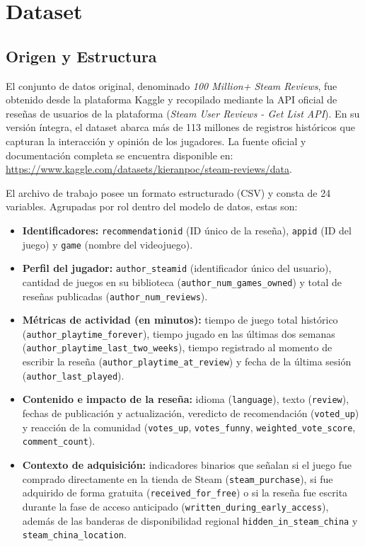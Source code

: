 \section{Dataset}

\subsection{Origen y Estructura}
El conjunto de datos original, denominado \textit{100 Million+ Steam Reviews}, fue obtenido desde la plataforma Kaggle y recopilado mediante la API oficial de reseñas de usuarios de la plataforma (\textit{Steam User Reviews - Get List API}). En su versión íntegra, el dataset abarca más de 113 millones de registros históricos que capturan la interacción y opinión de los jugadores. La fuente oficial y documentación completa se encuentra disponible en: \url{https://www.kaggle.com/datasets/kieranpoc/steam-reviews/data}.

El archivo de trabajo posee un formato estructurado (CSV) y consta de 24 variables. Agrupadas por rol dentro del modelo de datos, estas son:

\begin{itemize}[leftmargin=*]
    \item \textbf{Identificadores:} \texttt{recommendationid} (ID único de la reseña), \texttt{appid} (ID del juego) y \texttt{game} (nombre del videojuego).
    \item \textbf{Perfil del jugador:} \texttt{author\_steamid} (identificador único del usuario), cantidad de juegos en su biblioteca (\texttt{author\_\bk{}num\_\bk{}games\_\bk{}owned}) y total de reseñas publicadas (\texttt{author\_num\_reviews}).
    \item \textbf{Métricas de actividad (en minutos):} tiempo de juego total histórico (\texttt{author\_\bk{}playtime\_\bk{}forever}), tiempo jugado en las últimas dos semanas (\texttt{author\_\bk{}playtime\_\bk{}last\_\bk{}two\_\bk{}weeks}), tiempo registrado al momento de escribir la reseña (\texttt{author\_\bk{}playtime\_\bk{}at\_\bk{}review}) y fecha de la última sesión (\texttt{author\_last\_played}).
    \item \textbf{Contenido e impacto de la reseña:} idioma (\texttt{language}), texto (\texttt{review}), fechas de publicación y actualización, veredicto de recomendación (\texttt{voted\_up}) y reacción de la comunidad (\texttt{votes\_up}, \texttt{votes\_funny}, \texttt{weighted\_vote\_score}, \texttt{comment\_count}).
    \item \textbf{Contexto de adquisición:} indicadores binarios que señalan si el juego fue comprado directamente en la tienda de Steam (\texttt{steam\_purchase}), si fue adquirido de forma gratuita (\texttt{received\_for\_free}) o si la reseña fue escrita durante la fase de acceso anticipado (\texttt{written\_\bk{}during\_\bk{}early\_\bk{}access}), además de las banderas de disponibilidad regional \texttt{hidden\_\bk{}in\_\bk{}steam\_\bk{}china} y \texttt{steam\_\bk{}china\_\bk{}location}.
\end{itemize}

